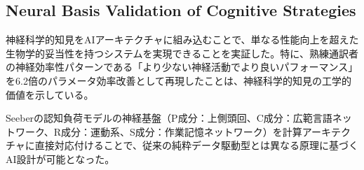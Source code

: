 \subsection{Neural Basis Validation of Cognitive Strategies}

神経科学的知見をAIアーキテクチャに組み込むことで、単なる性能向上を超えた生物学的妥当性を持つシステムを実現できることを実証した。特に、熟練通訳者の神経効率性パターンである「より少ない神経活動でより良いパフォーマンス」を6.2倍のパラメータ効率改善として再現したことは、神経科学的知見の工学的価値を示している。

Seeberの認知負荷モデルの神経基盤（P成分：上側頭回、C成分：広範言語ネットワーク、R成分：運動系、S成分：作業記憶ネットワーク）を計算アーキテクチャに直接対応付けることで、従来の純粋データ駆動型とは異なる原理に基づくAI設計が可能となった。 
